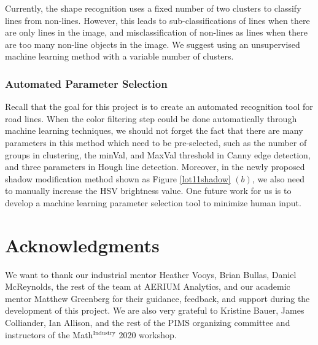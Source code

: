 \documentclass{m2pi}
\begin{document}
Currently, the shape recognition uses a fixed number of two clusters to classify lines from non-lines. However, this leads to sub-classifications of lines when there are only lines in the image, and misclassification of non-lines as lines when there are too many non-line objects in the image. We suggest using an unsupervised machine learning method with a variable number of clusters.


\subsubsection{Automated Parameter Selection}

Recall that the goal for this project is to create an automated 
recognition tool for road lines. When the color filtering step could be done 
automatically through machine learning techniques, we should not forget the fact 
that there are many parameters in this method which need to be pre-selected, 
such as the number of groups in clustering, the minVal, and MaxVal threshold 
in Canny edge detection, and three parameters in Hough line detection. 
Moreover, in the newly proposed shadow modification method shown as Figure 
\ref{lot11shadow} $(b)$, we also need to manually increase the HSV brightness 
value. {\color{red}One future work for us is to develop a machine learning parameter 
selection tool to minimize human input.  }



\section*{Acknowledgments}

We want to thank our industrial mentor Heather Vooys, Brian Bullas, Daniel McReynolds, the rest of the team at AERIUM Analytics, and our academic mentor Matthew Greenberg for their guidance, feedback, and support during the development of this project. We are also very grateful to Kristine Bauer, James Colliander, Ian Allison,  and the rest of the PIMS organizing committee and instructors of the Math$^{\text{Industry}}$ 2020 workshop.

\nocite{*}


\end{document}
